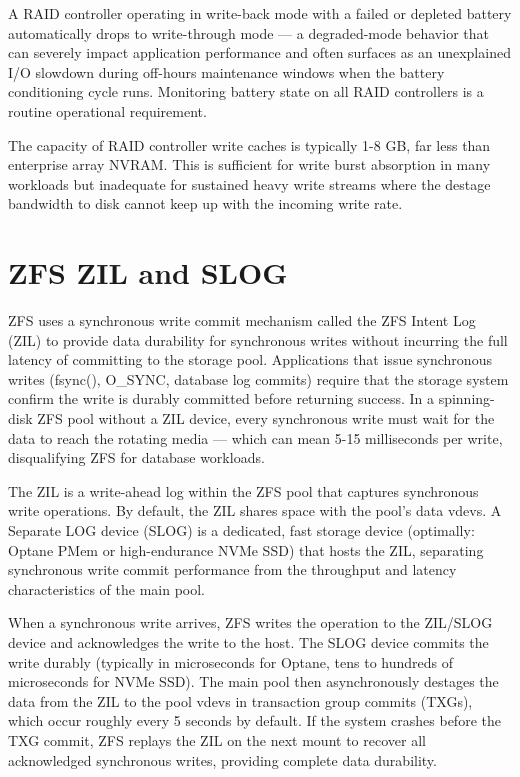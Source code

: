 A RAID controller operating in write-back mode with a failed or depleted battery automatically drops to write-through mode --- a degraded-mode behavior that can severely impact application performance and often surfaces as an unexplained I/O slowdown during off-hours maintenance windows when the battery conditioning cycle runs. Monitoring battery state on all RAID controllers is a routine operational requirement.

The capacity of RAID controller write caches is typically 1-8 GB, far less than enterprise array NVRAM. This is sufficient for write burst absorption in many workloads but inadequate for sustained heavy write streams where the destage bandwidth to disk cannot keep up with the incoming write rate.

\section{ZFS ZIL and SLOG}
ZFS uses a synchronous write commit mechanism called the ZFS Intent Log (ZIL) to provide data durability for synchronous writes without incurring the full latency of committing to the storage pool. Applications that issue synchronous writes (fsync(), O\_SYNC, database log commits) require that the storage system confirm the write is durably committed before returning success. In a spinning-disk ZFS pool without a ZIL device, every synchronous write must wait for the data to reach the rotating media --- which can mean 5-15 milliseconds per write, disqualifying ZFS for database workloads.

The ZIL is a write-ahead log within the ZFS pool that captures synchronous write operations. By default, the ZIL shares space with the pool's data vdevs. A Separate LOG device (SLOG) is a dedicated, fast storage device (optimally: Optane PMem or high-endurance NVMe SSD) that hosts the ZIL, separating synchronous write commit performance from the throughput and latency characteristics of the main pool.

When a synchronous write arrives, ZFS writes the operation to the ZIL/SLOG device and acknowledges the write to the host. The SLOG device commits the write durably (typically in microseconds for Optane, tens to hundreds of microseconds for NVMe SSD). The main pool then asynchronously destages the data from the ZIL to the pool vdevs in transaction group commits (TXGs), which occur roughly every 5 seconds by default. If the system crashes before the TXG commit, ZFS replays the ZIL on the next mount to recover all acknowledged synchronous writes, providing complete data durability.

